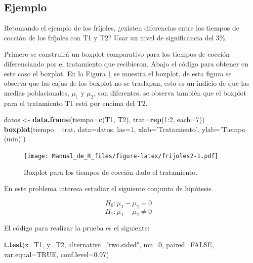 \documentclass[10pt,]{krantz}
\makeatletter
\newenvironment{Shaded}{\begin{snugshade}}{\end{snugshade}}
\newcommand{\KeywordTok}[1]{\textcolor[rgb]{0.13,0.29,0.53}{\textbf{{#1}}}}
\newcommand{\DataTypeTok}[1]{\textcolor[rgb]{0.13,0.29,0.53}{{#1}}}
\newcommand{\DecValTok}[1]{\textcolor[rgb]{0.00,0.00,0.81}{{#1}}}
\newcommand{\FloatTok}[1]{\textcolor[rgb]{0.00,0.00,0.81}{{#1}}}
\newcommand{\StringTok}[1]{\textcolor[rgb]{0.31,0.60,0.02}{{#1}}}
\newcommand{\OtherTok}[1]{\textcolor[rgb]{0.56,0.35,0.01}{{#1}}}
\newcommand{\NormalTok}[1]{{#1}}
\newenvironment{kframe}{%
\medskip{}
\setlength{\fboxsep}{.8em}
 \def\at@end@of@kframe{}%
 \ifinner\ifhmode%
  \def\at@end@of@kframe{\end{minipage}}%
  \begin{minipage}{\columnwidth}%
 \fi\fi%
 \def\FrameCommand##1{\hskip\@totalleftmargin \hskip-\fboxsep
 \colorbox{shadecolor}{##1}\hskip-\fboxsep
     \hskip-\linewidth \hskip-\@totalleftmargin \hskip\columnwidth}%
 \MakeFramed {\advance\hsize-\width
   \@totalleftmargin\z@ \linewidth\hsize
   \@setminipage}}%
 {\par\unskip\endMakeFramed%
 \at@end@of@kframe}
\renewenvironment{Shaded}{\begin{kframe}}{\end{kframe}}
\makeatother
\begin{document}
\subsection*{Ejemplo}\label{ejemplo-67}


Retomando el ejemplo de los fríjoles, ¿existen diferencias entre los
tiempos de cocción de los fríjoles con T1 y T2? Usar un nivel de
significancia del 3\%.

Primero se construirá un boxplot comparativo para los tiempos de cocción
diferenciando por el tratamiento que recibieron. Abajo el código para
obtener en este caso el boxplot. En la Figura \ref{fig:frijoles2} se
muestra el boxplot, de esta figura se observa que las cajas de los
boxplot no se traslapan, esto es un indicio de que las medias
poblacionales, \(\mu_1\) y \(\mu_2\), son diferentes, se observa también
que el boxplot para el tratamiento T1 está por encima del T2.

\begin{Shaded}
\begin{Highlighting}[]
\NormalTok{datos <-}\StringTok{ }\KeywordTok{data.frame}\NormalTok{(}\DataTypeTok{tiempo=}\KeywordTok{c}\NormalTok{(T1, T2), }\DataTypeTok{trat=}\KeywordTok{rep}\NormalTok{(}\DecValTok{1}\NormalTok{:}\DecValTok{2}\NormalTok{, }\DataTypeTok{each=}\DecValTok{7}\NormalTok{))}
\KeywordTok{boxplot}\NormalTok{(tiempo ~}\StringTok{ }\NormalTok{trat, }\DataTypeTok{data=}\NormalTok{datos, }\DataTypeTok{las=}\DecValTok{1}\NormalTok{,}
        \DataTypeTok{xlab=}\StringTok{'Tratamiento'}\NormalTok{, }\DataTypeTok{ylab=}\StringTok{'Tiempo (min)'}\NormalTok{)}
\end{Highlighting}
\end{Shaded}

\begin{figure}[htbp]
\centering
\texttt{[image: Manual\_de\_R\_files/figure-latex/frijoles2-1.pdf]}
\caption{\label{fig:frijoles2}Boxplot para los tiempos de cocción dado el
tratamiento.}
\end{figure}

En este problema interesa estudiar el siguiente conjunto de hipótesis.

\[H_0: \mu_1  - \mu_2 = 0\] \[H_1: \mu_1  - \mu_2 \neq 0\]

El código para realizar la prueba es el siguiente:

\begin{Shaded}
\begin{Highlighting}[]
\KeywordTok{t.test}\NormalTok{(}\DataTypeTok{x=}\NormalTok{T1, }\DataTypeTok{y=}\NormalTok{T2, }\DataTypeTok{alternative=}\StringTok{"two.sided"}\NormalTok{, }\DataTypeTok{mu=}\DecValTok{0}\NormalTok{, }
       \DataTypeTok{paired=}\OtherTok{FALSE}\NormalTok{, }\DataTypeTok{var.equal=}\OtherTok{TRUE}\NormalTok{, }\DataTypeTok{conf.level=}\FloatTok{0.97}\NormalTok{)}
\end{Highlighting}
\end{Shaded}
\end{document}
